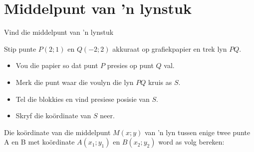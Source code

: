 \section{Middelpunt van ’n lynstuk}
\begin{Investigation}{Vind die middelpunt van 'n lynstuk}
\item Stip punte $P(2;1)$ en $Q(-2;2)$ akkuraat op grafiekpapier en trek lyn $PQ$.
\begin{itemize}
 \item Vou die papier so dat punt $P$ presies op punt $Q$ val.
\item Merk die punt waar die voulyn die lyn $PQ$ kruis as $S$.
\item Tel die blokkies en vind presiese posisie van $S$.
\item Skryf die ko\"ordinate van $S$ neer.
\end{itemize}

\end{Investigation}
Die koördinate van die middelpunt $M(x;y)$ van ’n lyn tussen enige twee punte A en B met koördinate $A(x_1;y_1)$ en $B(x_2;y_2)$ word as volg bereken:

\setcounter{subfigure}{0}
\begin{figure}[H] %
\begin{center}
\end{center}
\end{figure}      

